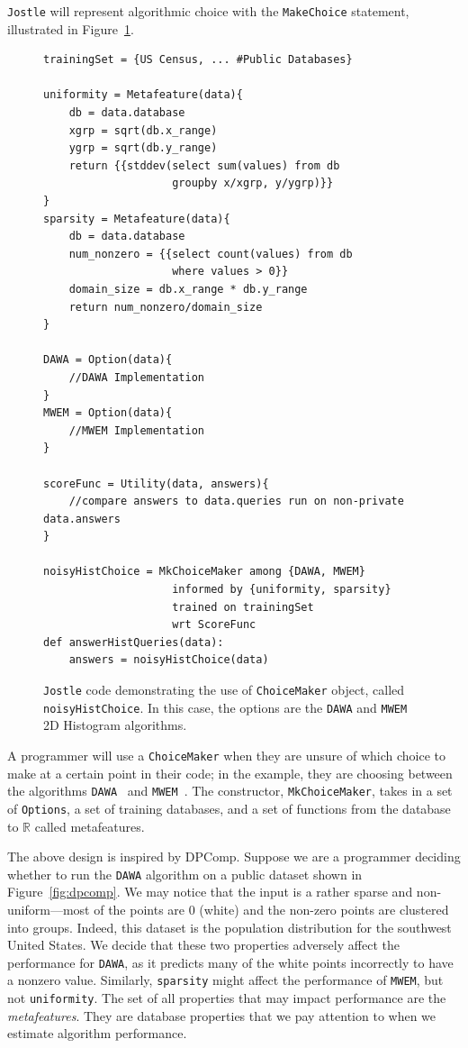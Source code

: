 \documentclass[11pt]{report}
\newcommand{\Jostle}{\texttt{Jostle}}
\renewcommand{\t}[1]{\texttt{#1}}
\begin{document}
\Jostle{} will represent algorithmic choice with the \t{MakeChoice} statement, illustrated in Figure~\ref{fig:1}.
\begin{figure}
\begin{lstlisting}[style=MyCStyle]
trainingSet = {US Census, ... #Public Databases}

uniformity = Metafeature(data){
    db = data.database
    xgrp = sqrt(db.x_range)
    ygrp = sqrt(db.y_range)
    return {{stddev(select sum(values) from db 
                    groupby x/xgrp, y/ygrp)}}
}
sparsity = Metafeature(data){
    db = data.database
    num_nonzero = {{select count(values) from db 
                    where values > 0}}
    domain_size = db.x_range * db.y_range
    return num_nonzero/domain_size
}

DAWA = Option(data){
    //DAWA Implementation
}
MWEM = Option(data){
    //MWEM Implementation
}

scoreFunc = Utility(data, answers){
    //compare answers to data.queries run on non-private data.answers
}

noisyHistChoice = MkChoiceMaker among {DAWA, MWEM}
                    informed by {uniformity, sparsity}
                    trained on trainingSet 
                    wrt ScoreFunc
def answerHistQueries(data):
    answers = noisyHistChoice(data)
\end{lstlisting}

\caption{\Jostle{} code demonstrating the use of \t{ChoiceMaker} object, called \t{noisyHistChoice}. In this case, the options are the \t{DAWA} and \t{MWEM} 2D Histogram algorithms.}
\label{fig:1}
\end{figure}
A programmer will use a \t{ChoiceMaker} when they are unsure of which choice to make at a certain point in their code; in the example, they are choosing between the algorithms \t{DAWA}~\cite{Li:2014} and \t{MWEM}~\cite{Hardt:2010}. The constructor, \t{MkChoiceMaker}, takes in a set of \t{Options}, a set of training databases, and a set of functions from the database to $\mathbb{R}$ called metafeatures.

The above design is inspired by DPComp. Suppose we are a programmer deciding whether to run the \t{DAWA} algorithm on a public dataset shown in Figure~\ref{fig:dpcomp}. We may notice that the input is a rather sparse and non-uniform---most of the points are 0 (white) and the non-zero points are clustered into groups. Indeed, this dataset is the population distribution for the southwest United States. We decide that these two properties adversely affect the performance for \t{DAWA}, as it predicts many of the white points incorrectly to have a nonzero value. Similarly, \t{sparsity} might affect the performance of \t{MWEM}, but not \t{uniformity}. The set of all properties that may impact performance are the \emph{metafeatures}. They are database properties that we pay attention to when we estimate algorithm performance.
\end{document}
